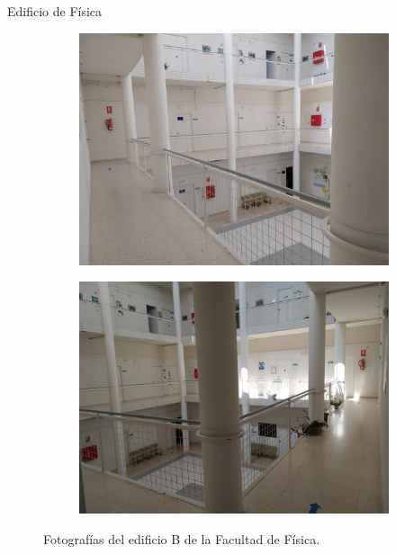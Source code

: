 \documentclass{beamer}
\begin{document}
  \begin{frame}{Edificio de Física}
    \begin{figure}[h]
      \begin{subfigure}[b]{.45\textwidth}
        \centering
        \includegraphics[width=\textwidth]{pic/fisica1.jpg}
        \label{fig:foto_fisica1}
      \end{subfigure}
      \begin{subfigure}[b]{.45\textwidth}
        \centering
        \includegraphics[width=\textwidth]{pic/fisica2.jpg}
        \label{fig:foto_fisica2}
      \end{subfigure}
      \caption{Fotografías del edificio B de la Facultad de Física.}
      \label{fig:foto_fisica}
    \end{figure}
  \end{frame}
\end{document}
